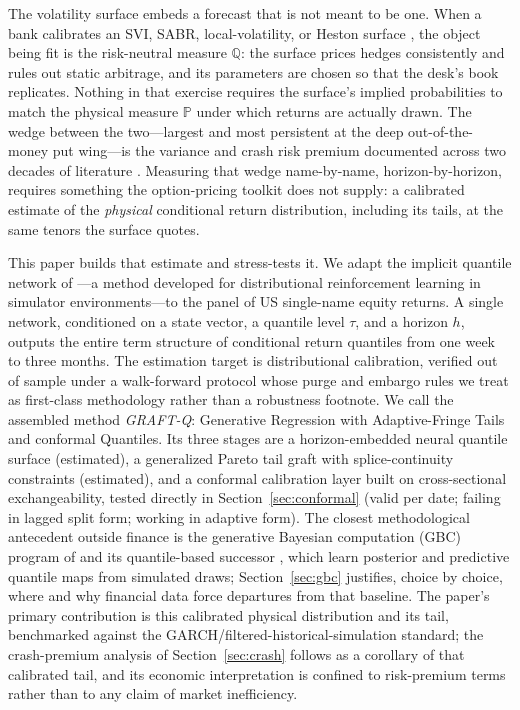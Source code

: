\documentclass[11pt]{article}
\newcommand{\Q}{\mathbb{Q}}
\newcommand{\PP}{\mathbb{P}}
\begin{document}
The volatility surface embeds a forecast that is not meant to be one. When a bank calibrates an SVI, SABR, local-volatility, or Heston surface \citep{gatheraljacquier2014, hagan2002, dupire1994, heston1993}, the object being fit is the risk-neutral measure $\Q$: the surface prices hedges consistently and rules out static arbitrage, and its parameters are chosen so that the desk's book replicates. Nothing in that exercise requires the surface's implied probabilities to match the physical measure $\PP$ under which returns are actually drawn. The wedge between the two---largest and most persistent at the deep out-of-the-money put wing---is the variance and crash risk premium documented across two decades of literature \citep{carrwu2009, bakshikapadia2003, bollerslevtodorov2011, coval2001, bondarenko2014}. Measuring that wedge name-by-name, horizon-by-horizon, requires something the option-pricing toolkit does not supply: a calibrated estimate of the \emph{physical} conditional return distribution, including its tails, at the same tenors the surface quotes.

This paper builds that estimate and stress-tests it. We adapt the implicit quantile network of \citet{dabney2018iqn}---a method developed for distributional reinforcement learning in simulator environments---to the panel of US single-name equity returns. A single network, conditioned on a state vector, a quantile level $\tau$, and a horizon $h$, outputs the entire term structure of conditional return quantiles from one week to three months. The estimation target is distributional calibration, verified out of sample under a walk-forward protocol whose purge and embargo rules we treat as first-class methodology rather than a robustness footnote. We call the assembled method \emph{GRAFT-Q}: Generative Regression with Adaptive-Fringe Tails and conformal Quantiles. Its three stages are a horizon-embedded neural quantile surface (estimated), a generalized Pareto tail graft with splice-continuity constraints (estimated), and a conformal calibration layer built on cross-sectional exchangeability, tested directly in Section~\ref{sec:conformal} (valid per date; failing in lagged split form; working in adaptive form). The closest methodological antecedent outside finance is the generative Bayesian computation (GBC) program of \citet{polson2023gbc} and its quantile-based successor \citet{nareklishvili2025gqbp}, which learn posterior and predictive quantile maps from simulated draws; Section~\ref{sec:gbc} justifies, choice by choice, where and why financial data force departures from that baseline. The paper's primary contribution is this calibrated physical distribution and its tail, benchmarked against the GARCH/filtered-historical-simulation standard; the crash-premium analysis of Section~\ref{sec:crash} follows as a corollary of that calibrated tail, and its economic interpretation is confined to risk-premium terms rather than to any claim of market inefficiency.
\end{document}
